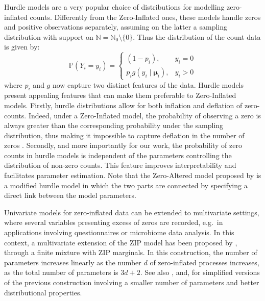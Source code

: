 \documentclass[11pt]{article}
\begin{document}
Hurdle models are a very popular choice of distributions for modelling zero-inflated counts. Differently from the Zero-Inflated ones, these models handle zeros and positive observations separately, assuming on the latter a sampling distribution with support on $\mathbb{N} = \mathbb{N}_0 \setminus \{0\}$. Thus the distribution of the count data is given by: 
\begin{equation}
	\mathbb{P}\left(Y_i = y_i\right) =
	\begin{cases}
		\left(1 - p_i\right), & y_i = 0 \\
		p_i g\left(y_i \mid \bm \mu_i\right), & y_i > 0
	\end{cases}
\end{equation}
where $p_i$ and $g$ now capture two distinct features of the data. Hurdle models present appealing features that can make them preferable to Zero-Inflated models. Firstly, hurdle distributions allow for both inflation and deflation of zero-counts. Indeed, under a Zero-Inflated model, the probability of observing a zero is always greater than the corresponding probability under the sampling distribution, thus making it impossible to capture deflation in the number of zeros \citep{min2005random}.
Secondly, and more importantly for our work, the probability of zero counts in hurdle models is independent of the parameters controlling the distribution of non-zero counts. This feature improves interpretability and facilitates parameter estimation. Note that the Zero-Altered model proposed by \citet{heilbron1994zero} is a modified hurdle model in which the two parts are connected by specifying a direct link between the model parameters.

Univariate models for zero-inflated data can be extended to multivariate settings, where several variables presenting excess of zeros are recorded, e.g.\ in applications involving questionnaires or microbiome data analysis. In this context, a multivariate extension of the ZIP model has been proposed by \citet{li1999multivariate}, through a finite mixture with ZIP marginals. In this construction, the number of parameters increases linearly as the number $d$ of zero-inflated processes increases, as the total number of parameters is $3d +2$. See also \cite{liu2015type}, \cite{liu2019new} and, \citet{tian2018type} for simplified versions of the previous construction involving a smaller number of parameters and better distributional properties.
\end{document}
